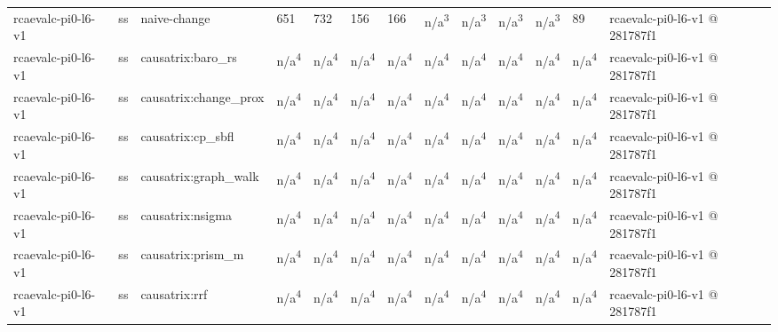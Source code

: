 \begin{table}[t]
\begin{tabular}{lllllllllllll}
rcaevalc-pi0-l6-v1 & ss & naive-change & 651 & 732 & 156 & 166 & n/a\textsuperscript{3} & n/a\textsuperscript{3} & n/a\textsuperscript{3} & n/a\textsuperscript{3} & 89 & rcaevalc-pi0-l6-v1 @ 281787f1 \\
rcaevalc-pi0-l6-v1 & ss & causatrix:baro\_rs & n/a\textsuperscript{4} & n/a\textsuperscript{4} & n/a\textsuperscript{4} & n/a\textsuperscript{4} & n/a\textsuperscript{4} & n/a\textsuperscript{4} & n/a\textsuperscript{4} & n/a\textsuperscript{4} & n/a\textsuperscript{4} & rcaevalc-pi0-l6-v1 @ 281787f1 \\
rcaevalc-pi0-l6-v1 & ss & causatrix:change\_prox & n/a\textsuperscript{4} & n/a\textsuperscript{4} & n/a\textsuperscript{4} & n/a\textsuperscript{4} & n/a\textsuperscript{4} & n/a\textsuperscript{4} & n/a\textsuperscript{4} & n/a\textsuperscript{4} & n/a\textsuperscript{4} & rcaevalc-pi0-l6-v1 @ 281787f1 \\
rcaevalc-pi0-l6-v1 & ss & causatrix:cp\_sbfl & n/a\textsuperscript{4} & n/a\textsuperscript{4} & n/a\textsuperscript{4} & n/a\textsuperscript{4} & n/a\textsuperscript{4} & n/a\textsuperscript{4} & n/a\textsuperscript{4} & n/a\textsuperscript{4} & n/a\textsuperscript{4} & rcaevalc-pi0-l6-v1 @ 281787f1 \\
rcaevalc-pi0-l6-v1 & ss & causatrix:graph\_walk & n/a\textsuperscript{4} & n/a\textsuperscript{4} & n/a\textsuperscript{4} & n/a\textsuperscript{4} & n/a\textsuperscript{4} & n/a\textsuperscript{4} & n/a\textsuperscript{4} & n/a\textsuperscript{4} & n/a\textsuperscript{4} & rcaevalc-pi0-l6-v1 @ 281787f1 \\
rcaevalc-pi0-l6-v1 & ss & causatrix:nsigma & n/a\textsuperscript{4} & n/a\textsuperscript{4} & n/a\textsuperscript{4} & n/a\textsuperscript{4} & n/a\textsuperscript{4} & n/a\textsuperscript{4} & n/a\textsuperscript{4} & n/a\textsuperscript{4} & n/a\textsuperscript{4} & rcaevalc-pi0-l6-v1 @ 281787f1 \\
rcaevalc-pi0-l6-v1 & ss & causatrix:prism\_m & n/a\textsuperscript{4} & n/a\textsuperscript{4} & n/a\textsuperscript{4} & n/a\textsuperscript{4} & n/a\textsuperscript{4} & n/a\textsuperscript{4} & n/a\textsuperscript{4} & n/a\textsuperscript{4} & n/a\textsuperscript{4} & rcaevalc-pi0-l6-v1 @ 281787f1 \\
rcaevalc-pi0-l6-v1 & ss & causatrix:rrf & n/a\textsuperscript{4} & n/a\textsuperscript{4} & n/a\textsuperscript{4} & n/a\textsuperscript{4} & n/a\textsuperscript{4} & n/a\textsuperscript{4} & n/a\textsuperscript{4} & n/a\textsuperscript{4} & n/a\textsuperscript{4} & rcaevalc-pi0-l6-v1 @ 281787f1 \\

\end{tabular}
\end{table}
